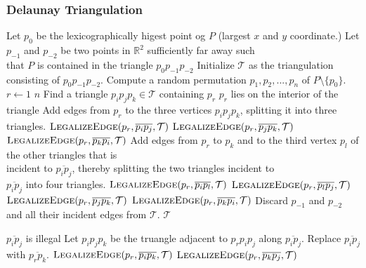 \subsubsection{Delaunay Triangulation}

\begin{codebox}
\li Let $p_0$ be the lexicographically higest point og $P$ (largest $x$ and $y$ coordinate.)
\li Let $p_{-1}$ and $p_{-2}$ be two points in $\mathbb{R}^2$ sufficiently far away such \\
    that $P$ is contained in the triangle $p_0p_{-1}p_{-2}$
\li Initialize $\mathcal{T}$ as the triangulation consisting of $p_0p_{-1}p_{-2}$.
\li Compute a random permutation $p_1,p_2,...,p_n$ of $P$\textbackslash$\{p_0\}$.
\li \For $r \gets 1$ \To $n$ \Do
\li   {}
\li   Find a triangle $p_ip_jp_k \in \mathcal{T}$ containing $p_r$
\li   \If $p_r$ lies on the interior of the triangle \Do
\li     Add edges from $p_r$ to the three vertices $p_ip_jp_k$, splitting it into three triangles.
\li     $\textnormal{\scshape LegalizeEdge}(p_r, \overline{p_ip_j}, \mathcal{T})$
\li     $\textnormal{\scshape LegalizeEdge}(p_r, \overline{p_jp_k}, \mathcal{T})$
\li     $\textnormal{\scshape LegalizeEdge}(p_r, \overline{p_kp_i}, \mathcal{T})$
\li   \Else {}
\li     Add edges from $p_r$ to $p_k$ and to the third vertex $p_l$ of the other triangles that is \\
        incident to $\overline{p_ip_j}$, thereby splitting the two triangles incident to \\
        $\overline{p_ip_j}$ into four triangles.
\li     $\textnormal{\scshape LegalizeEdge}(p_r, \overline{p_ip_l}, \mathcal{T})$
\li     $\textnormal{\scshape LegalizeEdge}(p_r, \overline{p_lp_j}, \mathcal{T})$
\li     $\textnormal{\scshape LegalizeEdge}(p_r, \overline{p_jp_k}, \mathcal{T})$
\li     $\textnormal{\scshape LegalizeEdge}(p_r, \overline{p_kp_i}, \mathcal{T})$ \End \End
\li Discard  $p_{-1}$ and $p_{-2}$ and all their incident edges from $\mathcal{T}$.
\li \Return $\mathcal{T}$
\end{codebox}

\begin{codebox}
\li \If $\overline{p_ip_j}$ is illegal \Do
\li   Let $p_ip_jp_k$ be the truangle adjacent to $p_rp_ip_j$ along $\overline{p_ip_j}$.
\li   Replace $\overline{p_ip_j}$ with $\overline{p_rp_k}$.
\li   $\textnormal{\scshape LegalizeEdge}(p_r, \overline{p_ip_k}, \mathcal{T})$
\li   $\textnormal{\scshape LegalizeEdge}(p_r, \overline{p_kp_j}, \mathcal{T})$
\end{codebox}

